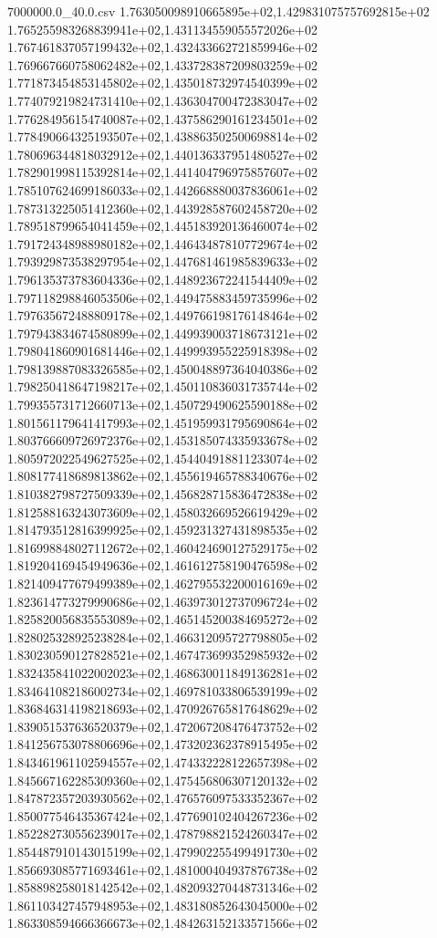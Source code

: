 \begin{filecontents*}{7000000.0_40.0.csv}
1.763050098910665895e+02,1.429831075757692815e+02
1.765255983268839941e+02,1.431134559055572026e+02
1.767461837057199432e+02,1.432433662721859946e+02
1.769667660758062482e+02,1.433728387209803259e+02
1.771873454853145802e+02,1.435018732974540399e+02
1.774079219824731410e+02,1.436304700472383047e+02
1.776284956154740087e+02,1.437586290161234501e+02
1.778490664325193507e+02,1.438863502500698814e+02
1.780696344818032912e+02,1.440136337951480527e+02
1.782901998115392814e+02,1.441404796975857607e+02
1.785107624699186033e+02,1.442668880037836061e+02
1.787313225051412360e+02,1.443928587602458720e+02
1.789518799654041459e+02,1.445183920136460074e+02
1.791724348988980182e+02,1.446434878107729674e+02
1.793929873538297954e+02,1.447681461985839633e+02
1.796135373783604336e+02,1.448923672241544409e+02
1.797118298846053506e+02,1.449475883459735996e+02
1.797635672488809178e+02,1.449766198176148464e+02
1.797943834674580899e+02,1.449939003718673121e+02
1.798041860901681446e+02,1.449993955225918398e+02
1.798139887083326585e+02,1.450048897364040386e+02
1.798250418647198217e+02,1.450110836031735744e+02
1.799355731712660713e+02,1.450729490625590188e+02
1.801561179641417993e+02,1.451959931795690864e+02
1.803766609726972376e+02,1.453185074335933678e+02
1.805972022549627525e+02,1.454404918811233074e+02
1.808177418689813862e+02,1.455619465788340676e+02
1.810382798727509339e+02,1.456828715836472838e+02
1.812588163243073609e+02,1.458032669526619429e+02
1.814793512816399925e+02,1.459231327431898535e+02
1.816998848027112672e+02,1.460424690127529175e+02
1.819204169454949636e+02,1.461612758190476598e+02
1.821409477679499389e+02,1.462795532200016169e+02
1.823614773279990686e+02,1.463973012737096724e+02
1.825820056835553089e+02,1.465145200384695272e+02
1.828025328925238284e+02,1.466312095727798805e+02
1.830230590127828521e+02,1.467473699352985932e+02
1.832435841022002023e+02,1.468630011849136281e+02
1.834641082186002734e+02,1.469781033806539199e+02
1.836846314198218693e+02,1.470926765817648629e+02
1.839051537636520379e+02,1.472067208476473752e+02
1.841256753078806696e+02,1.473202362378915495e+02
1.843461961102594557e+02,1.474332228122657398e+02
1.845667162285309360e+02,1.475456806307120132e+02
1.847872357203930562e+02,1.476576097533352367e+02
1.850077546435367424e+02,1.477690102404267236e+02
1.852282730556239017e+02,1.478798821524260347e+02
1.854487910143015199e+02,1.479902255499491730e+02
1.856693085771693461e+02,1.481000404937876738e+02
1.858898258018142542e+02,1.482093270448731346e+02
1.861103427457948953e+02,1.483180852643045000e+02
1.863308594666366673e+02,1.484263152133571566e+02

\end{filecontents*}
